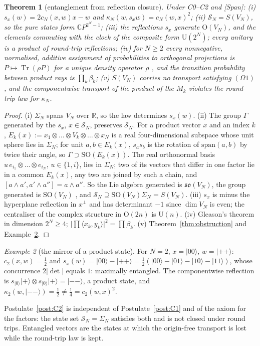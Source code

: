 \documentclass[aps,pra,onecolumn,superscriptaddress,nofootinbib,10pt]{revtex4-2}
\newtheorem{theorem}{Theorem}
\theoremstyle{definition}
\theoremstyle{remark}
\newtheorem{example}[theorem]{Example}
\newcommand{\R}{\mathbb{R}}
\newcommand{\C}{\mathbb{C}}
\newcommand{\tr}{\operatorname{Tr}}
\newcommand{\ip}[2]{\langle #1,#2\rangle}
\newcommand{\SO}{\mathrm{SO}}
\newcommand{\OO}{\mathrm{O}}
\newcommand{\U}{\mathrm{U}}
\begin{document}
\begin{theorem}[entanglement from reflection closure]\label{thm:comp}
Under C0--C2 and [Span]:
(i) $s_x(w)=2c_N(x,w)x-w$ and $\kappa_N(w,s_xw)=c_N(w,x)^2$;
(ii) $\mathcal S_N=S(V_N)$, so the pure states form $\C P^{2^N-1}$;
(iii) the reflections $s_x$ generate $\OO(V_N)$, and the elements commuting with the clock of the
composite form $\U(2^N)$; every unitary is a product of round-trip reflections;
(iv) for $N\ge2$ every nonnegative, normalised, additive assignment of probabilities to orthogonal
projections is $P\mapsto\tr(\rho P)$ for a unique density operator $\rho$ \cite{Gleason57}, and the
transition probability between product rays is $\prod_k\beta_k$;
(v) $S(V_N)$ carries no transport satisfying $(\Omega1)$, and the componentwise transport of the product
of the $M_k$ violates the round-trip law for $\kappa_N$.
\end{theorem}
\begin{proof}
(i) $\Sigma_N$ spans $V_N$ over $\R$, so the law determines $s_x(w)$.
(ii) The group $\Gamma$ generated by the $s_x$, $x\in\mathcal S_N$, preserves $\mathcal S_N$.  For a product
vector $x$ and an index $k$, $E_k(x):=x_1\otimes\dots\otimes V_k\otimes\dots\otimes x_N$ is a real
four-dimensional subspace whose unit sphere lies in $\Sigma_N$; for unit $a,b\in E_k(x)$, $s_as_b$ is the
rotation of $\mathrm{span}(a,b)$ by twice their angle, so $\Gamma\supset\SO(E_k(x))$.  The real
orthonormal basis $u\,e_{i_1}\otimes\dots\otimes e_{i_N}$, $u\in\{1,i\}$, lies in $\Sigma_N$; two of its
vectors that differ in one factor lie in a common $E_k(x)$, any two are joined by such a chain, and
$[a\wedge a',a'\wedge a'']=a\wedge a''$.  So the Lie algebra generated is $\mathfrak{so}(V_N)$, the group
generated is $\SO(V_N)$ \cite{Yamabe}, and $\mathcal S_N\supseteq\SO(V_N)\Sigma_N=S(V_N)$.
(iii) $s_x$ is minus the hyperplane reflection in $x^\perp$ and has determinant $-1$ since $\dim V_N$ is
even; the centraliser of the complex structure in $\OO(2n)$ is $\U(n)$.
(iv) Gleason's theorem in dimension $2^N\ge4$; $\lvert\prod\ip{x_k}{y_k}\rvert^2=\prod\beta_k$.
(v) Theorem~\ref{thm:obstruction} and Example~\ref{ex:mirror}.
\end{proof}

\begin{example}[the mirror of a product state]\label{ex:mirror}
For $N=2$, $x=\lvert00\rangle$, $w=\lvert{+}{+}\rangle$: $c_2(x,w)=\tfrac12$ and
$s_x(w)=\lvert00\rangle-\lvert{+}{+}\rangle=\tfrac12(\lvert00\rangle-\lvert01\rangle-\lvert10\rangle-\lvert11\rangle)$,
whose concurrence $2\lvert\det\rvert$ equals $1$: maximally entangled.  The componentwise reflection is
$s_{\lvert0\rangle}\lvert{+}\rangle\otimes s_{\lvert0\rangle}\lvert{+}\rangle=\lvert{-}{-}\rangle$, a product state, and
$\kappa_2(w,\lvert{-}{-}\rangle)=\tfrac12\ne\tfrac14=c_2(w,x)^2$.
\end{example}
Postulate~\ref{post:C2} is independent of Postulate~\ref{post:C1} and of the axiom for the factors: the
state set $\mathcal S_N=\Sigma_N$ satisfies both and is not closed under round trips.
Entangled vectors are the states at which the origin-free transport is lost while the round-trip law
is kept.
\end{document}
